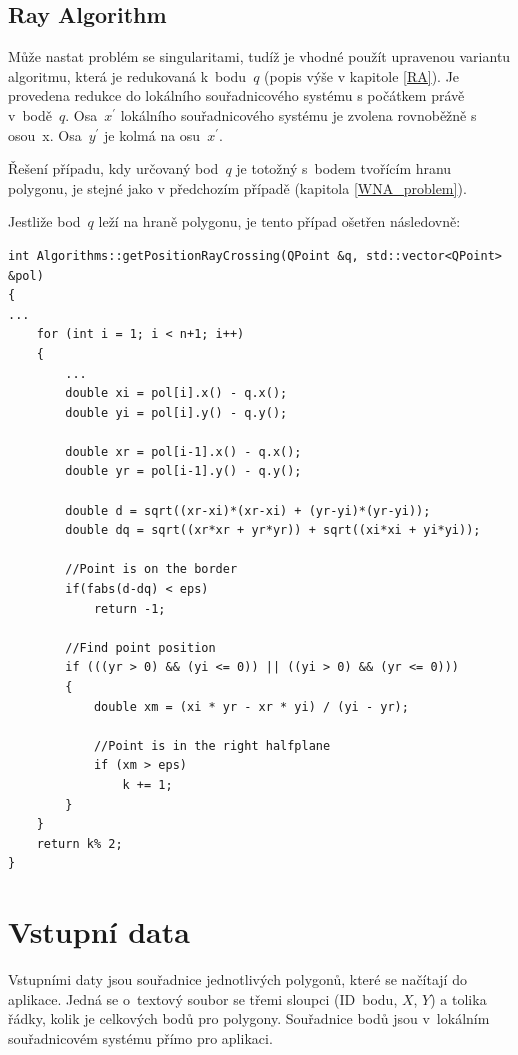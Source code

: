 \documentclass[a4paper, 12pt, oneside, titlepage]{article} %
\begin{document}
\subsection{Ray Algorithm} \label{RA_problem}
Může nastat problém se singularitami, tudíž je vhodné použít upravenou variantu algoritmu, která je redukovaná k~bodu~$q$ (popis výše v kapitole \ref{RA}). Je provedena redukce do lokálního souřadnicového systému s počátkem právě v~bodě~$q$. Osa~$x^{'}$ lokálního souřadnicového systému je zvolena rovnoběžně s osou~x. Osa~$y^{'}$ je kolmá na osu~$x^{'}$. 

Řešení případu, kdy určovaný bod~$q$ je totožný s~bodem tvořícím hranu polygonu, je stejné jako v předchozím případě (kapitola \ref{WNA_problem}).

Jestliže bod~$q$ leží na hraně polygonu, je tento případ ošetřen následovně:
\begin{verbatim}
int Algorithms::getPositionRayCrossing(QPoint &q, std::vector<QPoint> &pol)
{
...
    for (int i = 1; i < n+1; i++)
    {
        ...
        double xi = pol[i].x() - q.x();
        double yi = pol[i].y() - q.y();

        double xr = pol[i-1].x() - q.x();
        double yr = pol[i-1].y() - q.y();

        double d = sqrt((xr-xi)*(xr-xi) + (yr-yi)*(yr-yi));
        double dq = sqrt((xr*xr + yr*yr)) + sqrt((xi*xi + yi*yi));

        //Point is on the border
        if(fabs(d-dq) < eps)
            return -1;

        //Find point position
        if (((yr > 0) && (yi <= 0)) || ((yi > 0) && (yr <= 0)))
        {
            double xm = (xi * yr - xr * yi) / (yi - yr);

            //Point is in the right halfplane
            if (xm > eps)
                k += 1;
        }
    }
    return k% 2;
}

\end{verbatim}


\section{Vstupní data}
Vstupními daty jsou souřadnice jednotlivých polygonů, které se načítají do aplikace. Jedná se o~textový soubor se třemi sloupci (ID~bodu, $X$, $Y$) a tolika řádky, kolik je celkových bodů pro polygony. Souřadnice bodů jsou v~lokálním souřadnicovém systému přímo pro aplikaci.
\end{document}
